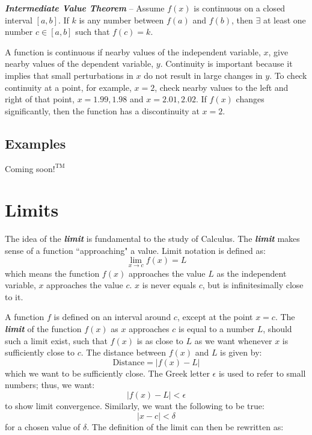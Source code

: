 \vspace{0.1in}
\textbf{\textit{Intermediate Value Theorem}} -- Assume $f(x)$ is continuous on a closed interval $[a, b]$. If $k$ is any number between $f(a)$ and $f(b)$, then $\exists$ at least one number $c \in [a, b]$ such that $f(c) = k$.

\vspace{0.1in}
A function is continuous if nearby values of the independent variable, $x$, give nearby values of the dependent variable, $y$. Continuity is important because it implies that small perturbations in $x$ do not result in large changes in $y$. To check continuity at a point, for example, $x = 2$, check nearby values to the left and right of that point, $x = 1.99, 1.98$ and $x = 2.01, 2.02$. If $f(x)$ changes significantly, then the function has a discontinuity at $x =2$.

\begin{center}
\section*{\small Examples}
Coming soon$!^{\text{TM}}$
\end{center}

\section{Limits}
The idea of the \textbf{\textit{limit}} is fundamental to the study of Calculus. The \textbf{\textit{limit}} makes sense of a function ``approaching" a value. Limit notation is defined as:
\begin{equation}
\lim_{x \rightarrow c} f(x) = L
\end{equation}
which means the function $f(x)$ approaches the value $L$ as the independent variable, $x$ approaches the value $c$. $x$ is never equals $c$, but is infinitesimally close to it.

\vspace{0.1in}
A function $f$ is defined on an interval around $c$, except at the point $x = c$. The \textbf{\textit{limit}} of the function $f(x)$ as $x$ approaches $c$ is equal to a number $L$, should such a limit exist, such that $f(x)$ is as close to $L$ as we want whenever $x$ is sufficiently close to $c$. The distance between $f(x)$ and $L$ is given by:
\begin{equation}
\text{Distance} = |f(x) - L|
\end{equation}
which we want to be sufficiently close. The Greek letter $\epsilon$ is used to refer to small numbers; thus, we want:
\begin{equation}
|f(x) - L| < \epsilon
\end{equation}
to show limit convergence. Similarly, we want the following to be true:
\begin{equation}
|x - c| < \delta
\end{equation}
for a chosen value of $\delta$. The definition of the limit can then be rewritten as:

